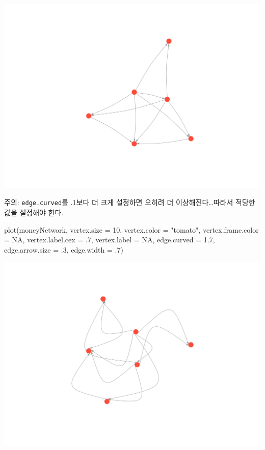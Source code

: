 \documentclass[
]{book}
\newenvironment{Shaded}{\begin{snugshade}}{\end{snugshade}}
\newcommand{\AttributeTok}[1]{\textcolor[rgb]{0.77,0.63,0.00}{#1}}
\newcommand{\ConstantTok}[1]{\textcolor[rgb]{0.00,0.00,0.00}{#1}}
\newcommand{\DecValTok}[1]{\textcolor[rgb]{0.00,0.00,0.81}{#1}}
\newcommand{\FloatTok}[1]{\textcolor[rgb]{0.00,0.00,0.81}{#1}}
\newcommand{\FunctionTok}[1]{\textcolor[rgb]{0.00,0.00,0.00}{#1}}
\newcommand{\NormalTok}[1]{#1}
\newcommand{\StringTok}[1]{\textcolor[rgb]{0.31,0.60,0.02}{#1}}
\begin{document}
\begin{center}\includegraphics[width=0.8\linewidth]{images/7} \end{center}

주의: \texttt{edge.curved}를 .1보다 더 크게 설정하면 오히려 더 이상해진다\ldots 따라서 적당한 값을 설정해야 한다.

\begin{Shaded}
\begin{Highlighting}[]
\FunctionTok{plot}\NormalTok{(moneyNetwork, }\AttributeTok{vertex.size =} \DecValTok{10}\NormalTok{, }\AttributeTok{vertex.color =} \StringTok{"tomato"}\NormalTok{, }\AttributeTok{vertex.frame.color =} \ConstantTok{NA}\NormalTok{, }\AttributeTok{vertex.label.cex =}\NormalTok{ .}\DecValTok{7}\NormalTok{,  }\AttributeTok{vertex.label =} \ConstantTok{NA}\NormalTok{, }\AttributeTok{edge.curved =} \FloatTok{1.7}\NormalTok{, }\AttributeTok{edge.arrow.size =}\NormalTok{ .}\DecValTok{3}\NormalTok{, }\AttributeTok{edge.width =}\NormalTok{ .}\DecValTok{7}\NormalTok{)}
\end{Highlighting}
\end{Shaded}

\begin{center}\includegraphics[width=0.8\linewidth]{images/8} \end{center}
\end{document}
